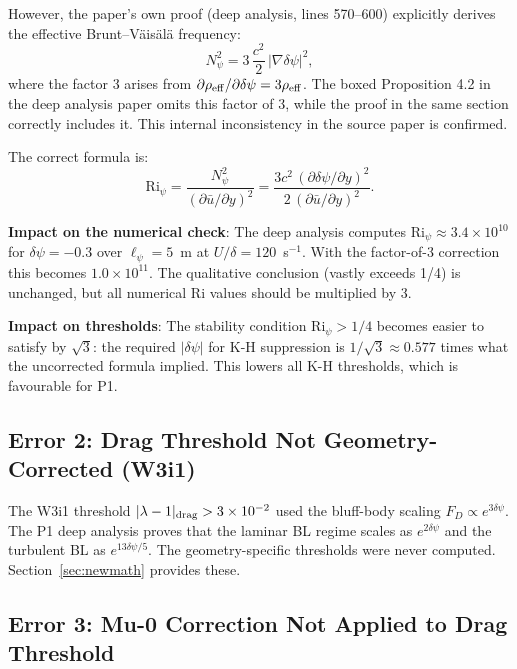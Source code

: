 \documentclass[11pt,twocolumn]{article}
\newcommand{\dpsi}{\delta\psi}
\newcommand{\lam}{\lambda}
\newcommand{\Ri}{\mathrm{Ri}}
\begin{document}
However, the paper's own proof (deep analysis, lines 570--600) explicitly
derives the effective Brunt--V\"ais\"al\"a frequency:
\begin{equation}
N_\psi^2 = 3\,\frac{c^2}{2}\,|\nabla\dpsi|^2,
\label{eq:N_correct}
\end{equation}
where the factor 3 arises from $\partial\rho_{\rm eff}/\partial\dpsi =
3\rho_{\rm eff}$. The boxed Proposition 4.2 in the deep analysis paper omits
this factor of 3, while the proof in the same section correctly includes it.
This internal inconsistency in the source paper is confirmed.

The correct formula is:
\begin{equation}
\boxed{
\Ri_\psi = \frac{N_\psi^2}{(\partial\bar{u}/\partial y)^2}
= \frac{3c^2\,(\partial\dpsi/\partial y)^2}{2\,(\partial\bar{u}/\partial y)^2}.
}
\label{eq:ri_correct}
\end{equation}

\textbf{Impact on the numerical check}: The deep analysis computes
$\Ri_\psi \approx 3.4\times10^{10}$ for $\dpsi = -0.3$ over $\ell_\psi = 5$~m
at $U/\delta = 120$~s$^{-1}$. With the factor-of-3 correction this becomes
$1.0\times10^{11}$. The qualitative conclusion (vastly exceeds 1/4) is
unchanged, but all numerical Ri values should be multiplied by 3.

\textbf{Impact on thresholds}: The stability condition $\Ri_\psi > 1/4$
becomes easier to satisfy by $\sqrt{3}$: the required $|\dpsi|$ for K-H
suppression is $1/\sqrt{3} \approx 0.577$ times what the uncorrected formula
implied. This lowers all K-H thresholds, which is favourable for P1.

\subsection{Error 2: Drag Threshold Not Geometry-Corrected (W3i1)}

The W3i1 threshold $|\lam-1|_{\rm drag} > 3\times10^{-2}$ used the bluff-body
scaling $F_D \propto e^{3\dpsi}$. The P1 deep analysis proves that the
laminar BL regime scales as $e^{2\dpsi}$ and the turbulent BL as
$e^{13\dpsi/5}$. The geometry-specific thresholds were never computed.
Section~\ref{sec:newmath} provides these.

\subsection{Error 3: Mu-0 Correction Not Applied to Drag Threshold}
\end{document}
